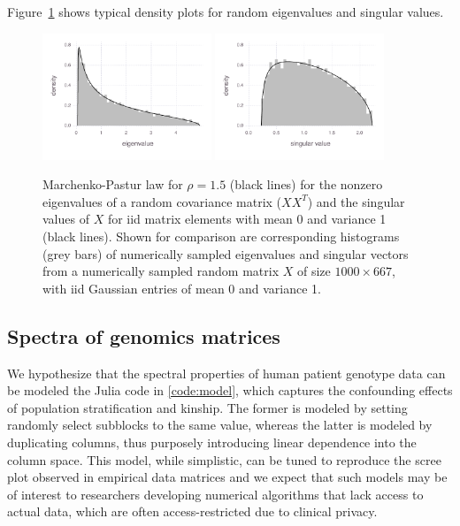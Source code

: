 \documentclass[final,leqno]{siamltex1213}
\begin{document}
Figure~\ref{fig:mplaw} shows typical density plots for random eigenvalues
and singular values.


\begin{figure}
\caption{Marchenko-Pastur law for $\rho=1.5$ (black lines) for the nonzero
eigenvalues of a random covariance matrix ($XX^{T}$) and the singular
values of $X$ for iid matrix elements with mean 0 and variance 1
(black lines). Shown for comparison are corresponding histograms (grey
bars) of numerically sampled eigenvalues and singular vectors from
a numerically sampled random matrix $X$ of size $1000\times667$,
with iid Gaussian entries of mean 0 and variance 1.
\label{fig:mplaw}
}

\includegraphics[width=0.45\textwidth]{fig/mplaw/fig-mplaw-ev}
%
\includegraphics[width=0.45\textwidth]{fig/mplaw/fig-mplaw-sv}
\end{figure}



\subsection{Spectra of genomics matrices}


We hypothesize that the spectral properties of human patient genotype data can
be modeled the Julia code in \ref{code:model}, which captures the confounding
effects of population stratification and kinship. The former is modeled by
setting randomly select subblocks to the same value, whereas the latter is
modeled by duplicating columns, thus purposely introducing linear dependence into
the column space. This model, while simplistic, can be tuned to reproduce the
scree plot observed in empirical data matrices and we expect that such models
may be of interest to researchers developing numerical algorithms that lack
access to actual data, which are often access-restricted due to clinical privacy.
\end{document}
